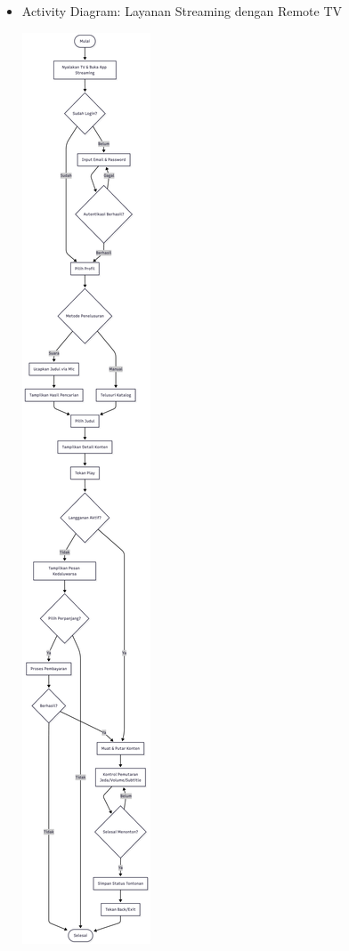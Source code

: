 \documentclass[a4paper]{article}
\begin{document}
\begin{enumerate}[itemsep=1em]
  \begin{itemize}[itemsep=1em]
    \item Activity Diagram: Layanan Streaming dengan Remote TV
    \begin{center}
      \includegraphics[height=0.9\textheight,keepaspectratio]{streaming-activity-diagram.png}
    \end{center}
  \end{itemize}
  

\end{enumerate}
\end{document}
